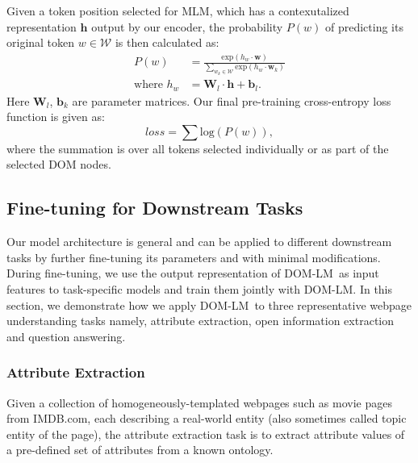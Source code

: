 \documentclass[sigconf, nonacm]{acmart}
\newcommand{\ours}[0]{DOM-LM}
\newcommand{\nop}[1]{}
\begin{document}
Given a token position selected for MLM, which has a contexutalized representation $\mathbf{h}$ output by our encoder, the probability $P(w)$ of predicting its original token $w \in \mathcal{W}$ is then calculated as: 
\begin{align}
    P(w) &= \frac{\mathrm{exp}\left(h_w\cdot\mathbf{w}\right)}{\sum_{w_k \in \mathcal{W}}{\mathrm{exp}\left(h_w\cdot\mathbf{w}_k\right)}}\\
    \mbox{where } h_w&=\boldsymbol{W}_l\cdot \mathbf{h}+\boldsymbol{b}_l.
\end{align}\nop{LINEAR is not a formal term in a mathematical definition. Let's use something like $\boldsymbol{W}_l\cdot h+\boldsymbol{b}_l$ to replace it.}
Here $\boldsymbol{W}_{l}$, $\boldsymbol{b}_{k}$ are parameter matrices. Our final pre-training cross-entropy loss function is given as:
 \begin{equation}
     loss = \sum{\mathrm{log}\left(P(w)\right)},
 \end{equation}
 {where the summation is over all tokens selected individually or as part of the selected DOM nodes.}

\subsection{Fine-tuning for Downstream Tasks}

Our model architecture is general and can be applied to different downstream tasks by further fine-tuning its parameters and with minimal modifications. During fine-tuning, we use the output representation of \ours\ as input features to task-specific models and train them jointly with \ours. In this section, we demonstrate how we apply \ours\ to three representative webpage understanding tasks namely, attribute extraction, open information extraction and question answering. \nop{Say a bit about what fine-tuning means: we are going to update the pre-trained model parameters for each downstream task separately right? (IOW, weights aren't frozen, correct?)}

\subsubsection{Attribute Extraction}
Given a collection of homogeneously-templated webpages such as movie pages from IMDB.com, each describing a real-world entity (also sometimes called topic entity of the page), the attribute extraction task is to extract attribute values of a pre-defined set of attributes from a known ontology. 
\end{document}
